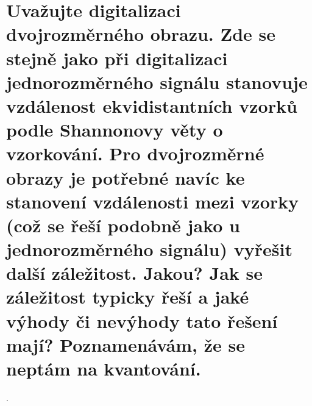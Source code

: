 \section{Uvažujte digitalizaci dvojrozměrného obrazu. Zde se stejně jako při digitalizaci jednorozměrného signálu 
stanovuje vzdálenost ekvidistantních vzorků podle Shannonovy věty o vzorkování. Pro dvojrozměrné obrazy je potřebné 
navíc ke stanovení vzdálenosti mezi vzorky (což se řeší podobně jako u jednorozměrného signálu) vyřešit další 
záležitost. Jakou? Jak se záležitost typicky řeší a jaké výhody či nevýhody tato řešení mají? Poznamenávám, že se neptám 
na kvantování.}.